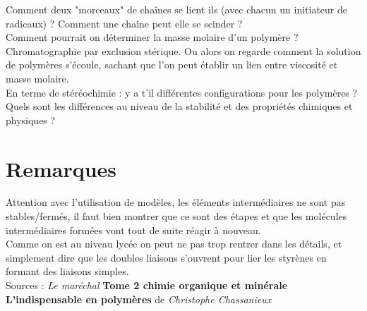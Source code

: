 \documentclass[12pt,prb,aps,epsf]{report}
\begin{document}
Comment deux "morceaux" de chaînes se lient ils (avec chacun un initiateur de radicaux) ? Comment une chaîne peut elle se scinder ?\\

Comment pourrait on déterminer la masse molaire d'un polymère ?\\
Chromatographie par exclusion stérique. Ou alors on regarde comment la solution de polymères s'écoule, sachant que l'on peut établir un lien entre viscosité et masse molaire.\\

En terme de stéréochimie : y a t'il différentes configurations pour les polymères ? Quels sont les différences au niveau de la stabilité et des propriétés chimiques et physiques ?

\section*{Remarques}
Attention avec l'utilisation de modèles, les éléments intermédiaires ne sont pas stables/fermés, il faut bien montrer que ce sont des étapes et que les molécules intermédiaires formées vont tout de suite réagir à nouveau.\\
Comme on est au niveau lycée on peut ne pas trop rentrer dans les détails, et simplement dire que les doubles liaisons s'ouvrent pour lier les styrènes en formant des liaisons simples.\\

Sources : \textit{Le maréchal} \textbf{Tome 2 chimie organique et minérale}\\
\textbf{L'indispensable en polymères} de \textit{Christophe Chassanieux}
\end{document}
